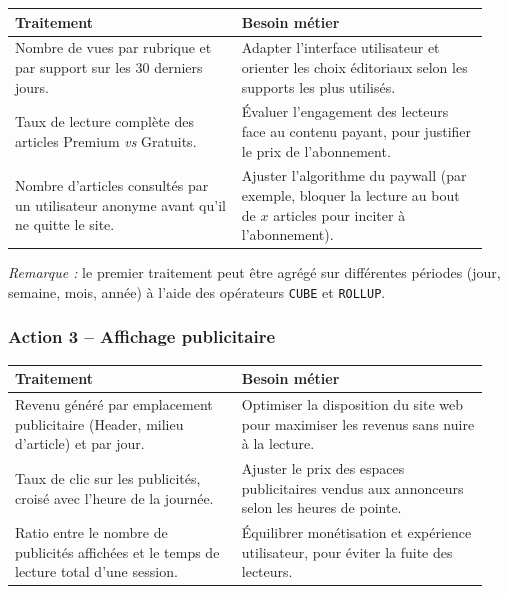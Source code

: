 \documentclass[a4paper,12pt]{article}
\begin{document}
\begin{center}
\renewcommand{\arraystretch}{1.3}
\begin{tabular}{@{}p{0.45\linewidth}p{0.49\linewidth}@{}}
  \toprule
  \textbf{Traitement} & \textbf{Besoin métier} \\
  \midrule
  Nombre de vues par rubrique et par support sur les 30 derniers jours.
    & Adapter l'interface utilisateur et orienter les choix éditoriaux
      selon les supports les plus utilisés. \\
  \addlinespace
  Taux de lecture complète des articles Premium \emph{vs} Gratuits.
    & Évaluer l'engagement des lecteurs face au contenu payant,
      pour justifier le prix de l'abonnement. \\
  \addlinespace
  Nombre d'articles consultés par un utilisateur anonyme avant qu'il
  ne quitte le site.
    & Ajuster l'algorithme du paywall (par exemple, bloquer la lecture
      au bout de $x$ articles pour inciter à l'abonnement). \\
  \bottomrule
\end{tabular}
\end{center}

\noindent\textit{Remarque :} le premier traitement peut être agrégé sur
différentes périodes (jour, semaine, mois, année) à l'aide des opérateurs
\texttt{CUBE} et \texttt{ROLLUP}.

\subsubsection*{Action 3 -- Affichage publicitaire}

\begin{center}
\renewcommand{\arraystretch}{1.3}
\begin{tabular}{@{}p{0.45\linewidth}p{0.49\linewidth}@{}}
  \toprule
  \textbf{Traitement} & \textbf{Besoin métier} \\
  \midrule
  Revenu généré par emplacement publicitaire (Header, milieu d'article)
  et par jour.
    & Optimiser la disposition du site web pour maximiser les revenus
      sans nuire à la lecture. \\
  \addlinespace
  Taux de clic sur les publicités, croisé avec l'heure de la journée.
    & Ajuster le prix des espaces publicitaires vendus aux annonceurs
      selon les heures de pointe. \\
  \addlinespace
  Ratio entre le nombre de publicités affichées et le temps de lecture
  total d'une session.
    & Équilibrer monétisation et expérience utilisateur, pour éviter
      la fuite des lecteurs. \\
  \bottomrule
\end{tabular}
\end{center}
\end{document}
